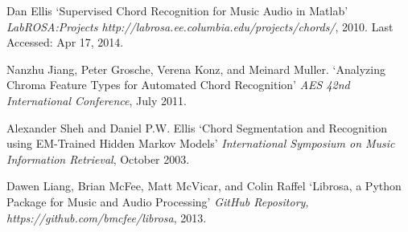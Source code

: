 \documentclass{article}
\begin{document}
\begin{thebibliography}{citations}
Dan Ellis
`Supervised Chord Recognition for Music Audio in Matlab'
{\it LabROSA:\@ Projects http://labrosa.ee.columbia.edu/projects/chords/},
2010. Last Accessed: Apr 17, 2014.

Nanzhu Jiang, Peter Grosche, Verena Konz, and Meinard Muller.
`Analyzing Chroma Feature Types for Automated Chord Recognition'
{\it AES 42nd International Conference},
July 2011.

Alexander Sheh and Daniel P.W. Ellis
`Chord Segmentation and Recognition using EM-Trained Hidden Markov Models'
{\it International Symposium on Music Information Retrieval},
October 2003.

Dawen Liang, Brian McFee, Matt McVicar, and Colin Raffel
`Librosa, a Python Package for Music and Audio Processing'
{\it GitHub Repository, https://github.com/bmcfee/librosa},
2013.

\end{thebibliography}


\end{document}
